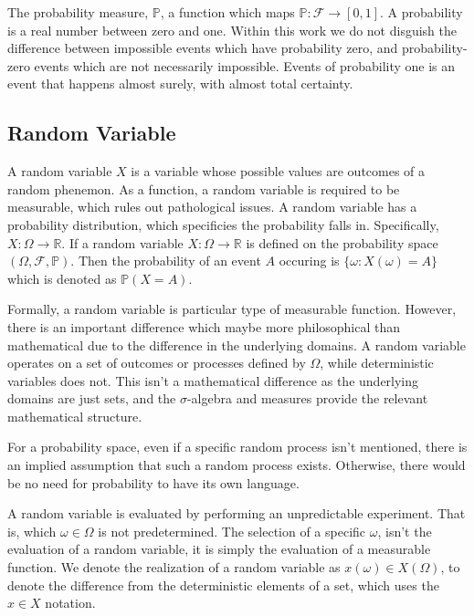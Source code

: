 The probability measure, $\mathbb{P}$, a function which maps $\mathbb{P}:\mathcal{F}\rightarrow[0,1]$.  A probability is a real number between zero and one.  Within this work we do not disguish the difference between impossible events which have probability zero, and probability-zero events which are not necessarily impossible.  Events of probability one is an event that happens almost surely, with almost total certainty.

\subsection{Random Variable}

A random variable $X$ is a variable whose possible values are outcomes of a random phenemon.  As a function, a random variable is required to be measurable, which rules out pathological issues.  A random variable has a probability distribution, which specificies the probability falls in.  Specifically, $X:\Omega\rightarrow\mathbb{R}$.  If a random variable $X:\Omega \rightarrow \mathbb{R}$ is defined on the probability space $(\Omega,\mathcal{F},\mathbb{P})$.  Then the probability of an event $A$ occuring is $\{\omega:X(\omega)=A\}$ which is denoted as $\mathbb{P}(X=A)$.

Formally, a random variable is particular type of measurable function.  However, there is an important difference which maybe more philosophical than mathematical due to the difference in the underlying domains.  A random variable operates on a set of outcomes or processes defined by $\Omega$, while deterministic variables does not.  This isn't a mathematical difference as the underlying domains are just sets, and the $\sigma$-algebra and measures provide the relevant mathematical structure.

For a probability space, even if a specific random process isn't mentioned, there is an implied assumption that such a random process exists.  Otherwise, there would be no need for probability to have its own language.

A random variable is evaluated by performing an unpredictable experiment.  That is, which $\omega \in \Omega$ is not predetermined.  The selection of a specific $\omega$, isn't the evaluation of a random variable, it is simply the evaluation of a measurable function.  We denote the realization of a random variable as $x(\omega) \in X(\Omega)$, to denote the difference from the deterministic elements of a set, which uses the $x \in X$ notation.


